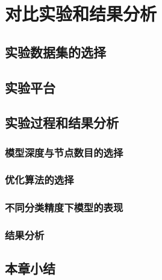 \chapter{对比实验和结果分析}

\section{实验数据集的选择}

\section{实验平台}

\section{实验过程和结果分析}

\subsection{模型深度与节点数目的选择}

\subsection{优化算法的选择}

\subsection{不同分类精度下模型的表现}

\subsection{结果分析}

\section{本章小结}